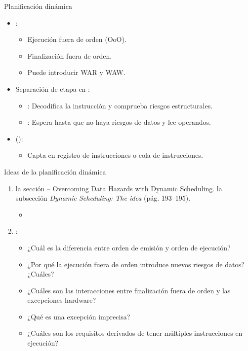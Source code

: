 \begin{frame}[t]{Planificación dinámica}
\begin{itemize}
  \item {}:
    \begin{itemize}
      \item Ejecución fuera de orden (OoO).
      \item Finalización fuera de orden.
      \item Puede introducir  WAR y WAW.
    \end{itemize}

  \item Separación de etapa  en :
    \begin{itemize}
      \item {}: Decodifica la instrucción y comprueba riesgos estructurales.
      \item {}: Espera hasta que no haya riesgos de datos y lee operandos.
    \end{itemize}

  \item {} ():
    \begin{itemize}
      \item Capta en registro de instrucciones o cola de instrucciones.
    \end{itemize}
\end{itemize}
\end{frame}

\begin{frame}[t]{Ideas de la planificación dinámica}
  \begin{enumerate}
    \item {} la sección  --
          Overcoming Data Hazards with Dynamic Scheduling.
           la subsección \emph{Dynamic Scheduling: The idea}
          (pág. 193--195).
      \begin{itemize}
        \item \bibhennessy
      \end{itemize}

    \item {}:
      \begin{itemize}
        \item ¿Cuál es la diferencia entre orden de emisión y orden de ejecución?
        \item ¿Por qué la ejecución fuera de orden introduce nuevos riesgos de datos? ¿Cuáles?
        \item ¿Cuáles son las interacciones entre finalización fuera de orden y las excepciones hardware?
        \item ¿Qué es una excepción imprecisa?
        \item ¿Cuáles son los requisitos derivados de tener múltiples instrucciones en ejecución?
      \end{itemize}
  \end{enumerate}
\end{frame}


